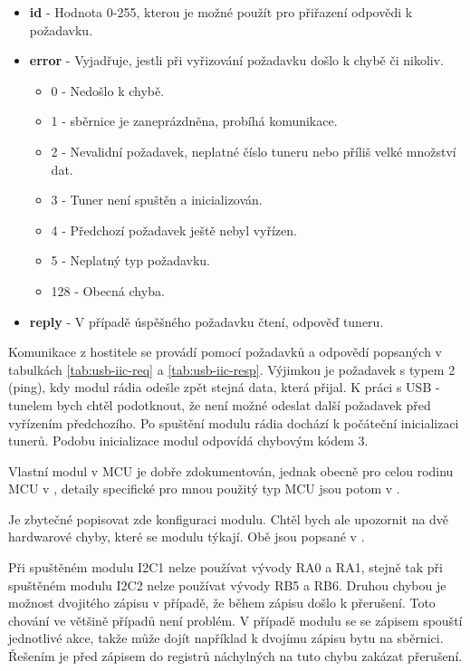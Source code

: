 \begin{itemize}
\item \textbf{id} - Hodnota 0-255, kterou je možné použít pro přiřazení odpovědi k požadavku.
\item {\textbf{error} - Vyjadřuje, jestli při vyřizování požadavku došlo k chybě či nikoliv. 
	\begin{itemize}
	\item 0 - Nedošlo k chybě.
	\item 1 - \iic sběrnice je zaneprázdněna, probíhá komunikace.
	\item 2 - Nevalidní požadavek, neplatné číslo tuneru nebo příliš velké množství dat.
	\item 3 - Tuner není spuštěn a inicializován.
	\item 4 - Předchozí požadavek ještě nebyl vyřízen.
	\item 5 - Neplatný typ požadavku.
	\item 128 - Obecná chyba.
	\end{itemize}
}
\item \textbf{reply} - V případě úspěšného požadavku čtení, odpověď tuneru.
\end{itemize} 

Komunikace z hostitele se provádí pomocí požadavků a odpovědí popsaných v tabulkách \ref{tab:usb-iic-req} a \ref{tab:usb-iic-resp}. Výjimkou je požadavek s typem 2 (ping), kdy modul rádia odešle zpět stejná data, která přijal. K práci s USB - \iic tunelem bych chtěl podotknout, že není možné odeslat další požadavek před vyřízením předchozího. Po spuštění modulu rádia dochází k počáteční inicializaci tunerů. Podobu inicializace modul odpovídá chybovým kódem 3.

Vlastní modul \iic v MCU je dobře zdokumentován, jednak obecně pro celou rodinu MCU v \cite{pic-iic}, detaily specifické pro mnou použitý typ MCU jsou potom v \cite{pic}.

Je zbytečné popisovat zde konfiguraci \iic modulu. Chtěl bych ale upozornit na dvě hardwarové chyby, které se modulu týkají. Obě jsou popsané v \cite{pic-errata}.

Při spuštěném modulu I2C1 nelze používat vývody RA0 a RA1, stejně tak při spuštěném modulu I2C2 nelze používat vývody RB5 a RB6. 
Druhou chybou je možnost dvojitého zápisu v případě, že během zápisu došlo k přerušení. Toto chování ve většině případů není problém. V případě \iic modulu se se zápisem spouští jednotlivé akce, takže může dojít například k dvojímu zápisu bytu na sběrnici. Řešením je před zápisem do registrů náchylných na tuto chybu zakázat přerušení.